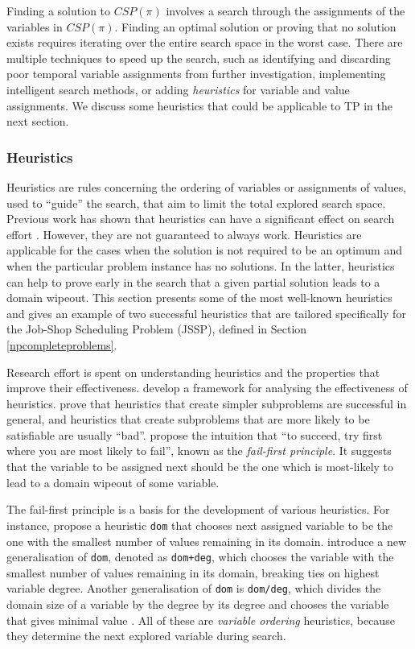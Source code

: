 \documentclass{mprop}
\theoremstyle{definition}
\begin{document}
Finding a solution to $CSP(\pi)$ involves a search through the assignments of the variables in $CSP(\pi)$. Finding an optimal solution or proving that no solution exists requires iterating over the entire search space in the worst case. There are multiple techniques to speed up the search, such as identifying and discarding poor temporal variable assignments from further investigation, implementing intelligent search methods, or adding \textit{heuristics} for variable and value assignments. We discuss some heuristics that could be applicable to TP in the next section.

\subsubsection{Heuristics}
Heuristics are rules concerning the ordering of variables or assignments of values, used to ``guide'' the search, that aim to limit the total explored search space. Previous work has shown that heuristics can have a significant effect on search effort \citep{Haralick80:a, Gent96}. However, they are not guaranteed to always work. Heuristics are applicable for the cases when the solution is not required to be an optimum and when the particular problem instance has no solutions. In the latter, heuristics can help to prove early in the search that a given partial solution leads to a domain wipeout. This section presents some of the most well-known heuristics and gives an example of two successful heuristics that are tailored specifically for the Job-Shop Scheduling Problem (JSSP), defined in Section \ref{npcompleteproblems}.

Research effort is spent on understanding heuristics and the properties that improve their effectiveness. \citet{Christopher03} develop a framework for analysing the effectiveness of  heuristics. \citet{Hooker95} prove that heuristics that create simpler subproblems are successful in general, and heuristics that create subproblems that are more likely to be satisfiable are usually ``bad''. \citet{Haralick80} propose the intuition that ``to succeed, try first where you are most likely to fail'', known as the \textit{fail-first principle}. It suggests that the variable to be assigned next should be the one which is most-likely to lead to a domain wipeout of some variable.

The fail-first principle is a basis for the development of various heuristics. For instance, \citet{Golomb65} propose a heuristic \texttt{dom} that chooses next assigned variable to be the one with the smallest number of values remaining in its domain. \citet{Brelaz79} introduce a new generalisation of \texttt{dom}, denoted as \texttt{dom+deg}, which chooses the variable with the smallest number of values remaining in its domain, breaking ties on highest variable degree. Another generalisation of \texttt{dom} is \texttt{dom/deg}, which divides the domain size of a variable by the degree by its degree and chooses the variable that gives minimal value \citep{Bessiere96}. All of these are \textit{variable ordering} heuristics, because they determine the next explored variable during search.
\end{document}
